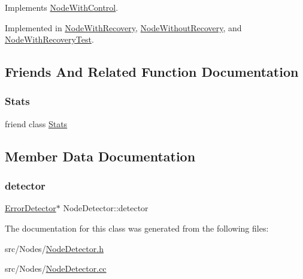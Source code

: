 Implements \hyperlink{class_node_with_control_a84df0beabbaed80e7da017d592480515}{Node\+With\+Control}.



Implemented in \hyperlink{class_node_with_recovery_aec147b3723b3dab00f9610453ba8daba}{Node\+With\+Recovery}, \hyperlink{class_node_without_recovery_a8cf83ec6d0af26e385dcde0bc03f5b6d}{Node\+Without\+Recovery}, and \hyperlink{class_node_with_recovery_test_af9b78d0ed4fefb97e2f54c9279aa4655}{Node\+With\+Recovery\+Test}.



\subsection{Friends And Related Function Documentation}
\mbox{\label{class_node_detector_a129f65b6976377739eb6231b6962985e}} 
\subsubsection{\texorpdfstring{Stats}{Stats}}
{\footnotesize\ttfamily friend class \hyperlink{class_stats}{Stats}\hspace{0.3cm}{\ttfamily [friend]}}



\subsection{Member Data Documentation}
\mbox{\label{class_node_detector_a711fd643dc29b74e6dfe87e1aeb1b227}} 
\subsubsection{\texorpdfstring{detector}{detector}}
{\footnotesize\ttfamily \hyperlink{class_error_detector}{Error\+Detector}$\ast$ Node\+Detector\+::detector\hspace{0.3cm}{\ttfamily [protected]}}



The documentation for this class was generated from the following files\+:\begin{DoxyCompactItemize}
\item 
src/\+Nodes/\hyperlink{_node_detector_8h}{Node\+Detector.\+h}\item 
src/\+Nodes/\hyperlink{_node_detector_8cc}{Node\+Detector.\+cc}\end{DoxyCompactItemize}
